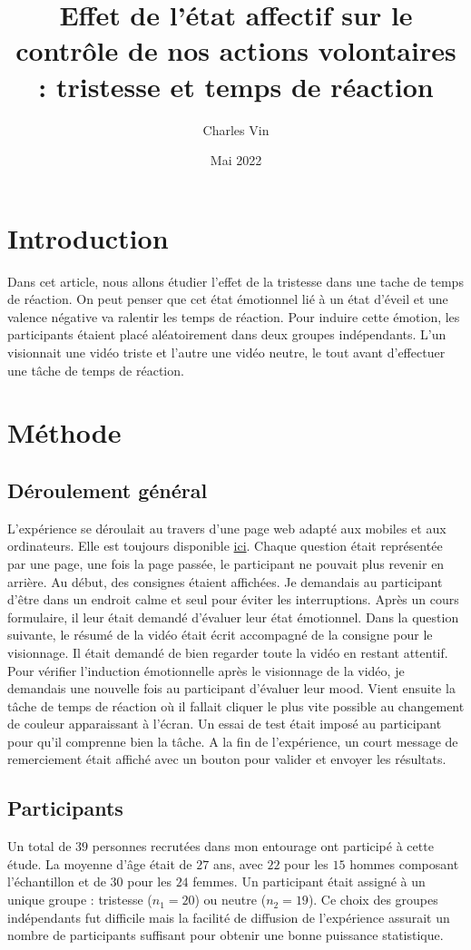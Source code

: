 \documentclass{article}
\title{Effet de l'état affectif sur le contrôle de nos actions volontaires : tristesse et temps de réaction}
\author{Charles Vin}
\date{Mai 2022}
\begin{document}
\maketitle

\section{Introduction}
Dans cet article, nous allons étudier l'effet de la tristesse dans une tache de temps de réaction. On peut penser que cet état émotionnel lié à un état d'éveil et une valence négative va ralentir les temps de réaction. Pour induire cette émotion, les participants étaient placé aléatoirement dans deux groupes indépendants. L'un visionnait une vidéo triste et l'autre une vidéo neutre, le tout avant d'effectuer une tâche de temps de réaction.

\section{Méthode}
\subsection{Déroulement général}
L'expérience se déroulait au travers d'une page web adapté aux mobiles et aux ordinateurs. Elle est toujours disponible \href{https://charlesattend.github.io/exp-psycho/}{ici}. Chaque question était représentée par une page, une fois la page passée, le participant ne pouvait plus revenir en arrière. Au début, des consignes étaient affichées. Je demandais au participant d'être dans un endroit calme et seul pour éviter les interruptions. Après un cours formulaire, il leur était demandé d'évaluer leur état émotionnel. Dans la question suivante, le résumé de la vidéo était écrit accompagné de la consigne pour le visionnage. Il était demandé de bien regarder toute la vidéo en restant attentif. 
Pour vérifier l'induction émotionnelle après le visionnage de la vidéo, je demandais une nouvelle fois au participant d'évaluer leur mood. Vient ensuite la tâche de temps de réaction où il fallait cliquer le plus vite possible au changement de couleur apparaissant à l'écran. Un essai de test était imposé au participant pour qu'il comprenne bien la tâche. A la fin de l'expérience, un court message de remerciement était affiché avec un bouton pour valider et envoyer les résultats.

\subsection{Participants}
Un total de $ 39 $ personnes recrutées dans mon entourage ont participé à cette étude. La moyenne d'âge était de $ 27 $ ans, avec $ 22 $ pour les $ 15 $ hommes composant l'échantillon et de $ 30 $ pour les $ 24 $ femmes. Un participant était assigné à un unique groupe : tristesse ($n_1 = 20$) ou neutre ($n_2=19$). Ce choix des groupes indépendants fut difficile mais la facilité de diffusion de l'expérience assurait un nombre de participants suffisant pour obtenir une bonne puissance statistique.
\end{document}
